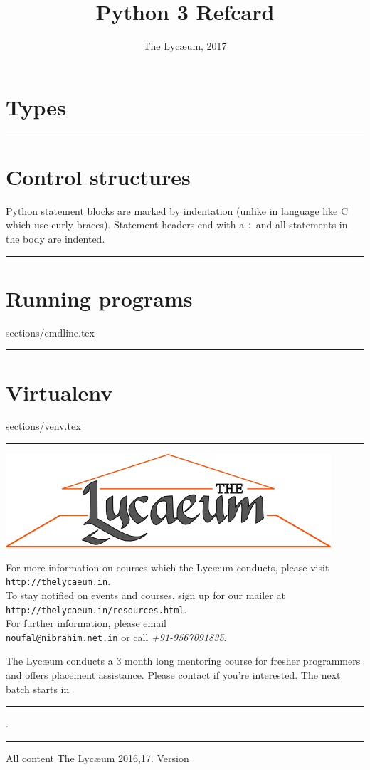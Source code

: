 \documentclass{../refsheet}
\title{Python 3 Refcard}
\author{The Lyc\ae{}um, 2017}
\date{}
\begin{document}
\maketitle
\section{Types}







\noindent\rule{\linewidth}{0.05ex}
\section{Control structures}
Python statement blocks are marked by indentation (unlike in language
like C which use curly braces). Statement headers end with a
\texttt{:} and all statements in the body are indented.







\noindent\rule{\linewidth}{0.05ex}
\section{Running programs}
 {sections/cmdline.tex}

\noindent\rule{\linewidth}{0.05ex}
\section{Virtualenv}
 {sections/venv.tex}

\noindent\rule{\linewidth}{0.05ex}
\begin{center}
\includegraphics[scale=0.4]{../images/parthenon-callig.png}
\end{center}
For more information on courses which the Lyc\ae{}um conducts, please
visit \texttt{http://thelycaeum.in}. \\To stay notified on events and
courses, sign up for our mailer at \texttt{http://thelycaeum.in/resources.html}. \\For further
information, please email \\\texttt{noufal@nibrahim.net.in} or call
\textit{+91-9567091835}.
\vspace{0.5cm}

The Lyc\ae{}um conducts a 3 month long mentoring course for fresher
programmers and offers placement assistance. Please contact if you're
interested. The next batch starts in \rule{4cm}{0.1ex}.

    \textcolor{lightgray}{\noindent\rule{\linewidth}{0.05ex}}
\footnotesize All content \textcopyright The Lyc\ae{}um 2016,17. Version 
\end{document}
